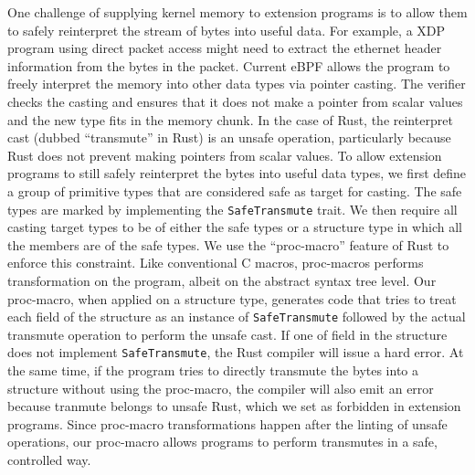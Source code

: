 One challenge of supplying kernel memory to extension programs is to allow them
    to safely reinterpret the stream of bytes into useful data.
For example, a XDP program using direct packet access might need to extract
    the ethernet header information from the bytes in the packet.
Current eBPF allows the program to freely interpret the memory into other
    data types via pointer casting.
The verifier checks the casting and ensures that it does not make a pointer
    from scalar values and the new type fits in the memory chunk.
In the case of Rust, the reinterpret cast (dubbed ``transmute'' in Rust) is an
    unsafe operation, particularly because Rust does not prevent making
    pointers from scalar values.
To allow extension programs to still safely reinterpret the bytes into useful
    data types, we first define a group of primitive types that are considered
    safe as target for casting.
The safe types are marked by implementing the \texttt{SafeTransmute} trait.
We then require all casting target types to be of either the safe types or a
    structure type in which all the members are of the safe types.
We use the ``proc-macro'' feature of Rust to enforce this constraint.
Like conventional C macros, proc-macros performs transformation on the program,
    albeit on the abstract syntax tree level.
Our proc-macro, when applied on a structure type, generates code that tries
    to treat each field of the structure as an instance of
    \texttt{SafeTransmute} followed by the actual transmute operation to
    perform the unsafe cast.
If one of field in the structure does not implement \texttt{SafeTransmute},
    the Rust compiler will issue a hard error.
At the same time, if the program tries to directly transmute the bytes into a
    structure without using the proc-macro, the compiler will also emit an
    error because tranmute belongs to unsafe Rust, which we set as forbidden
    in extension programs.
Since proc-macro transformations happen after the linting of unsafe operations,
    our proc-macro allows programs to perform transmutes in a safe, controlled
    way.

